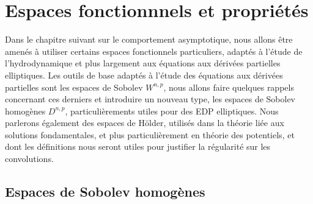 \chapter{Espaces fonctionnnels et propriétés}

Dans le chapitre suivant sur le comportement asymptotique, nous allons être amenés à utiliser certains espaces fonctionnels particuliers, adaptés à l'étude de l'hydrodynamique et plus largement aux équations aux dérivées partielles elliptiques.
Les outils de base adaptés à l'étude des équations aux dérivées partielles sont les espaces de Sobolev $W^{n,p}$, nous allons faire quelques rappels concernant ces derniers et introduire un nouveau type, les espaces de Sobolev homogènes $D^{n,p}$, particulièrements utiles pour
des EDP elliptiques.
Nous parlerons également des espaces de Hölder, utilisés dans la théorie liée aux solutions fondamentales, et plus particulièrement en théorie des potentiels, et dont les définitions nous seront utiles pour justifier la régularité sur les convolutions.


\section{Espaces de Sobolev homogènes}

